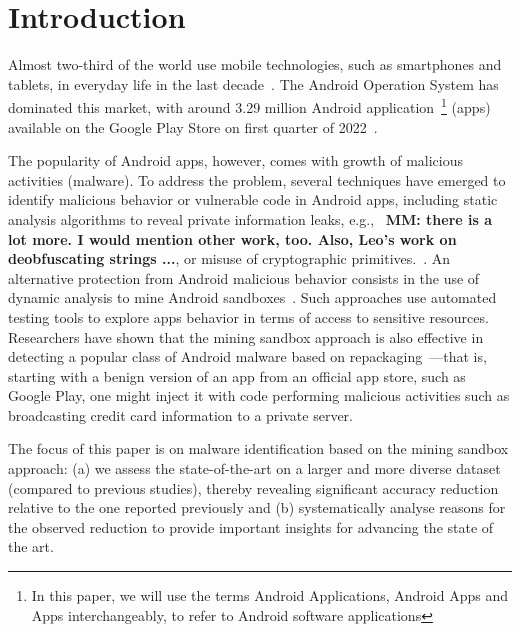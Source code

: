 \section{Introduction}\label{sec:introduction}

Almost two-third of the world use mobile technologies, such as smartphones and tablets, in everyday life in the last decade~\cite{Comscore,DBLP:journals/tse/MartinSJZH17}. The Android Operation System has dominated this market, with around 3.29 million Android application~\footnote{In this paper, we will use the terms Android Applications, Android Apps and Apps interchangeably, to refer to Android software applications} (apps) available on the Google Play Store on first quarter of 2022~\cite{Statista}. 

The popularity of Android apps, however,
comes with growth of malicious activities (malware).  
To address the problem,
several techniques have emerged to identify malicious behavior or vulnerable code in Android apps, 
including static analysis algorithms to reveal private information 
leaks, e.g.,~\cite{DBLP:conf/pldi/ArztRFBBKTOM14} \textbf{MM: there is a lot more. I would mention other work, too. Also, Leo's work on deobfuscating strings ...}, or misuse of 
cryptographic primitives.~\cite{DBLP:journals/tse/KrugerSABM21}. 
An alternative
protection from Android malicious behavior consists in the use of dynamic analysis to mine Android sandboxes~\cite{DBLP:conf/icse/JamrozikSZ16}. Such approaches use automated testing tools 
to explore apps behavior in terms of access to sensitive resources. Researchers have shown that the mining sandbox approach is also effective in detecting a popular class of Android malware based on repackaging~\cite{DBLP:conf/wcre/BaoLL18,le2018towards}---that is, starting with a benign version of an app from an official app store, such as Google Play, one might inject it with code performing malicious activities such as broadcasting credit card information to a private server.~\cite{DBLP:journals/tse/LiBK21} %

The focus of this paper is on malware identification based on the mining sandbox approach: 
(a) we assess the state-of-the-art on a larger and more diverse dataset (compared to previous studies),
thereby revealing significant accuracy reduction relative to the one reported previously and 
(b) systematically analyse reasons for the observed reduction to provide important insights for 
advancing the state of the art.

